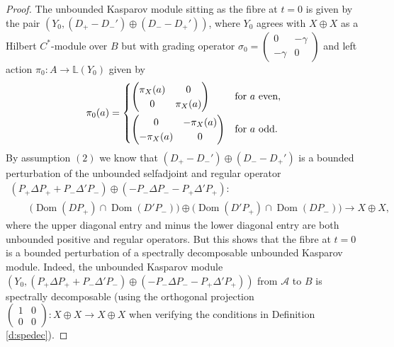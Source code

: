 \documentclass[pdftex]{sigma}
\numberwithin{equation}{section}
\newcommand{\op}{\oplus}
\newcommand{\ga}{\gamma}
\newcommand{\De}{\Delta}
\newcommand{\si}{\sigma}
\newcommand{\s}[1]{\mathscr{#1}}
\newcommand{\B}[1]{\mathbb{#1}}
\begin{document}
\begin{proof}
The unbounded Kasparov module sitting as the fibre at $t = 0$ is given by the pair $( Y_0, (D_+ - D_-') \op (D_- - D_+') )$, where $Y_0$ agrees with $X \op X$ as a Hilbert $C^*$-module over $B$ but with grading operator $\si_0 = \left(\begin{smallmatrix} 0 & - \ga \\ - \ga & 0\end{smallmatrix}\right)$ and left action $\pi_0\colon A \to \B L(Y_0)$ given by
\[
\pi_0(a) = \begin{cases} \left(\begin{matrix} \pi_X(a) & 0 \\ 0 & \pi_X(a)\end{matrix}\right) & \text{for} \ a \text{ even}, \vspace{1mm}\\ \left(\begin{matrix} 0 & -\pi_X(a) \\ -\pi_X(a) & 0\end{matrix}\right) & \text{for} \ a \text{ odd} .\end{cases}
\]
By assumption $(2)$ we know that $(D_+ - D_-') \op (D_- - D_+')$ is a bounded perturbation of the unbounded selfadjoint and regular operator
\begin{gather*}
 ( P_+ \De P_+ + P_- \De' P_- ) \op ( - P_- \De P_- - P_+ \De' P_+)\colon \\
\qquad {}\big( \operatorname{Dom}( DP_+) \cap \operatorname{Dom}( D' P_-) \big) \op \big( \operatorname{Dom}( D'P_+) \cap \operatorname{Dom}( D P_-) \big) \to X \op X ,
\end{gather*}
where the upper diagonal entry and minus the lower diagonal entry are both unbounded positive and regular operators. But this shows that the fibre at $t = 0$ is a bounded perturbation of a spectrally decomposable unbounded Kasparov module. Indeed, the unbounded Kasparov module $( Y_0, ( P_+ \De P_+ + P_- \De' P_- ) \op ( - P_- \De P_- - P_+ \De' P_+) )$ from $\s A$ to $B$ is spectrally decomposable (using the orthogonal projection $\left(\begin{smallmatrix} 1 & 0 \\ 0 & 0\end{smallmatrix}\right)\colon X \op X \to X \op X$ when verifying the conditions in Definition \ref{d:spedec}).
\end{proof}
\end{document}
